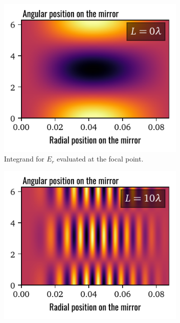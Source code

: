 \documentclass[11pt,SymmetricalJury]{inrsthesis/inrsthesis}
\begin{document}
\begin{figure}
  \begin{subfigure}[t]{0.32\textwidth}
    \centering
    \includegraphics[width=\textwidth]{figs/phase_0L.pdf}
    \caption{Integrand for $E_r$ evaluated at the focal point.}
    \label{fig:sc.oscillating-phase-with-distance.0L}
  \end{subfigure}
  \hfill
  \begin{subfigure}[t]{0.32\textwidth}
    \centering
    \includegraphics[width=\textwidth]{figs/phase_10L.pdf}

\end{subfigure}
\end{figure}
\end{document}

